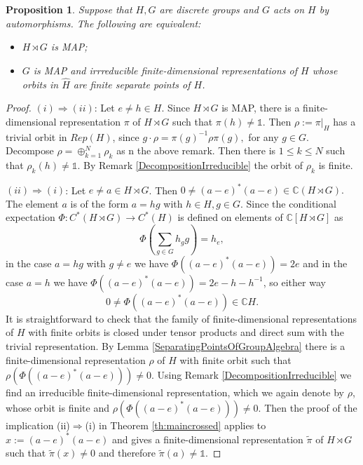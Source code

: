 \documentclass[11 pt, leqno, hidelinks]{amsart}%
\theoremstyle{plain}
\newtheorem{proposition}[theorem]{Proposition}
\numberwithin{equation}{section}
\begin{document}
\begin{proposition}\label{MAPversion}  Suppose that $H, G$ are discrete groups and $G$ acts on $H$ by automorphisms.  The following are equivalent:

\begin{itemize}
		\item [(i)] $H\rtimes G$ is MAP;

\medskip

\item[(ii)]  $G$ is MAP and irrreducible finite-dimensional representations of $H$ whose orbits in $\widehat H$ are finite  separate points of $H$.
\end{itemize}
\end{proposition}
\begin{proof} $ (i) \Longrightarrow  (ii)$: Let $e\neq h \in H$. Since $H\rtimes G$ is MAP, there is a finite-dimensional representation $\pi$ of $H\rtimes G$  such that $\pi(h) \neq \mathbb 1$.  Then $\rho:=\pi|_H$ has a trivial orbit in $Rep(H)$, since
$g \cdot \rho  = \pi(g)^{-1} \rho \pi(g), $ for any $g\in G$. Decompose  $\rho = \oplus_{k=1}^N \rho_k$ as n the above remark. Then there is $1\le k\le N$ such that $\rho_k(h) \neq \mathbb 1$. By Remark \ref{DecompositionIrreducible}  the orbit of $\rho_k$ is finite.

\medskip

 $ (ii) \Longrightarrow  (i)$: Let $e\neq a \in H \rtimes G$. Then $0\neq (a-e)^*(a-e) \in \mathbb C(H\rtimes G).$ The element $a$ is of the form $a= hg$ with $h\in H, g\in G$. Since  the conditional expectation $\Phi: C^*(H \rtimes G) \to C^*(H)$ is defined on elements of $\mathbb C [H\rtimes G]$  as $$\Phi(\sum_{g\in G} h_g g) = h_e, $$ in the case $a= hg$ with $g\neq e$ we have $\Phi( (a-e)^*(a-e))  = 2e$ and in the case $a= h$ we have $\Phi( (a-e)^*(a-e)) = 2e  - h - h^{-1}$, so either way $$0 \neq \Phi( (a-e)^*(a-e)) \in \mathbb CH.$$
 It is straightforward to check that the family of finite-dimensional representations of $H$  with finite orbits  is closed under  tensor products and direct sum with the trivial representation. By Lemma  \ref{SeparatingPointsOfGroupAlgebra}  there is a finite-dimensional representation $\rho$ of $H$ with finite orbit such that $\rho(\Phi\left((a-e)^*(a-e)\right))\neq 0.$ Using Remark \ref{DecompositionIrreducible} we find an irreducible finite-dimensional representation, which we again denote by $\rho$,  whose orbit is finite and $\rho(\Phi\left((a-e)^*(a-e)\right))\neq 0.$ Then the proof  of the implication (ii)$\Longrightarrow$(i) in Theorem \ref{th:maincrossed} applies to $x:= (a-e)^*(a-e)$ and gives a finite-dimensional representation $\tilde \pi$ of $H\rtimes G$ such that $\tilde\pi(x)\neq 0$ and therefore $\tilde\pi(a)  \neq \mathbb 1.$	
\end{proof}
\end{document}
